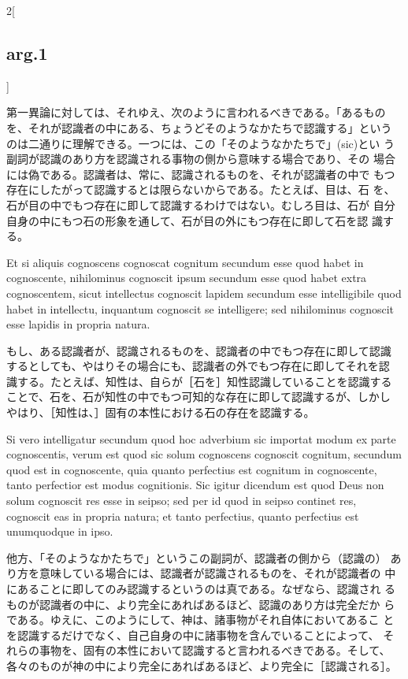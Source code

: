 \documentclass[paper=a4paper,fontsize=10pt,jafontsize=9pt,titlepage]{jlreq}
\begin{document}
\begin{paracol}{2}[\subsection{arg.1}]
\switchcolumn

第一異論に対しては、それゆえ、次のように言われるべきである。「あるもの
を、それが認識者の中にある、ちょうどそのようなかたちで認識する」という
のは二通りに理解できる。一つには、この「そのようなかたちで」(sic)とい
う副詞が認識のあり方を認識される事物の側から意味する場合であり、その
場合には偽である。認識者は、常に、認識されるものを、それが認識者の中で
もつ存在にしたがって認識するとは限らないからである。たとえば、目は、石
を、石が目の中でもつ存在に即して認識するわけではない。むしろ目は、石が
自分自身の中にもつ石の形象を通して、石が目の外にもつ存在に即して石を認
識する。

\switchcolumn*

Et si aliquis cognoscens cognoscat cognitum secundum esse quod habet
in cognoscente, nihilominus cognoscit ipsum secundum esse quod habet
extra cognoscentem, sicut intellectus cognoscit lapidem secundum esse
intelligibile quod habet in intellectu, inquantum cognoscit se
intelligere; sed nihilominus cognoscit esse lapidis in propria natura.

\switchcolumn

もし、ある認識者が、認識されるものを、認識者の中でもつ存在に即して認識
するとしても、やはりその場合にも、認識者の外でもつ存在に即してそれを認
識する。たとえば、知性は、自らが［石を］知性認識していることを認識する
ことで、石を、石が知性の中でもつ可知的な存在に即して認識するが、しかし
やはり、［知性は、］固有の本性における石の存在を認識する。

\switchcolumn*

Si vero intelligatur secundum quod hoc adverbium sic importat modum ex
parte cognoscentis, verum est quod sic solum cognoscens cognoscit
cognitum, secundum quod est in cognoscente, quia quanto perfectius est
cognitum in cognoscente, tanto perfectior est modus cognitionis. Sic
igitur dicendum est quod Deus non solum cognoscit res esse in seipso;
sed per id quod in seipso continet res, cognoscit eas in propria
natura; et tanto perfectius, quanto perfectius est unumquodque in
ipso.

\switchcolumn

他方、「そのようなかたちで」というこの副詞が、認識者の側から（認識の）
あり方を意味している場合には、認識者が認識されるものを、それが認識者の
中にあることに即してのみ認識するというのは真である。なぜなら、認識され
るものが認識者の中に、より完全にあればあるほど、認識のあり方は完全だか
らである。ゆえに、このようにして、神は、諸事物がそれ自体においてあるこ
とを認識するだけでなく、自己自身の中に諸事物を含んでいることによって、
それらの事物を、固有の本性において認識すると言われるべきである。そして、
各々のものが神の中により完全にあればあるほど、より完全に［認識される］。


\end{paracol}
\end{document}
